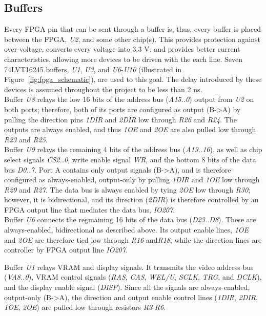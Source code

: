 \documentclass{scrartcl}
\begin{document}
	\subsection{Buffers}
	Every FPGA pin that can be sent through a buffer is; thus, every buffer is placed between the FPGA, \textit{U2}, and some other chip(s). This provides protection against over-voltage, converts every voltage into 3.3 V, and provides better current characteristics, allowing more devices to be driven with the each line. Seven 74LVT16245 buffers, \textit{U1}, \textit{U3}, and \textit{U6}-\textit{U10} (illustrated in Figure~\ref{fig:fpga_schematic}), are used to this goal. The delay introduced by these devices is assumed throughout the project to be less than 2 ns.\\

	Buffer \textit{U8} relays the low 16 bits of the address bus (\textit{A15..0}) output from \textit{U2} on both ports; therefore, both of its ports are configured as output (B->A) by pulling the direction pins \textit{1DIR} and \textit{2DIR} low through \textit{R26} and \textit{R24}. The outputs are always enabled, and thus \textit{1OE} and \textit{2OE} are also pulled low through \textit{R23} and \textit{R25}.\\

	Buffer \textit{U9} relays the remaining 4 bits of the address bus (\textit{A19..16}), as well as chip select signals \textit{CS2..0}, write enable signal \textit{WR}, and the bottom 8 bits of the data bus \textit{D0..7}. Port A contains only output signals (B->A), and is therefore configured as always-enabled, output-only by pulling \textit{1DIR} and \textit{1OE} low through \textit{R29} and \textit{R27}. The data bus is always enabled by tying \textit{2OE} low through \textit{R30}; however, it is bidirectional, and its direction (\textit{2DIR}) is therefore controlled by an FPGA output line that mediates the data bus, \textit{IO207}.\\

	Buffer \textit{U6} connects the regmaining 16 bits of the data bus (\textit{D23..D8}). These are always-enabled, bidirectional as described above. Its output enable lines, \textit{1OE} and \textit{2OE} are therefore tied low through \textit{R16} and\textit{R18}, while the direction lines are controller by FPGA output line \textit{IO207}.

	Buffer \textit{U1} relays VRAM and display signals. It transmits the video address bus (\textit{VA8..0}), VRAM control signals (\textit{RAS}, \textit{CAS}, \textit{WEL/U}, \textit{SCLK}, \textit{TRG}, and \textit{DCLK}), and the display enable signal (\textit{DISP}). Since all the signals are always-enabled, output-only (B->A), the direction and output enable control lines (\textit{1DIR}, \textit{2DIR}, \textit{1OE}, \textit{2OE}) are pulled low through resistors \textit{R3}-\textit{R6}.\\
\end{document}
